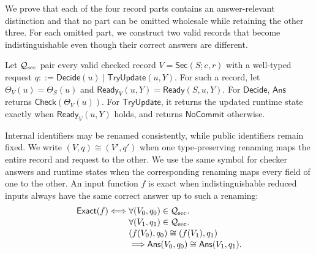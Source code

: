 We prove that each of the four record parts contains an answer-relevant distinction and that no part can be omitted wholesale while retaining the other three.
For each omitted part, we construct two valid records that become indistinguishable even though their correct answers are different.

Let \(\mathcal Q_{\rm sec}\) pair every valid checked record \(V=\mathsf{Sec}(S;c,r)\) with a well-typed request \(q::=\mathsf{Decide}(u)\mid\mathsf{TryUpdate}(u,Y)\).
For such a record, let \(\Theta_V(u)=\Theta_S(u)\) and \(\mathsf{Ready}_V(u,Y)=\mathsf{Ready}(S,u,Y)\).
For \(\mathsf{Decide}\), \(\mathsf{Ans}\) returns \(\mathsf{Check}(\Theta_V(u))\).
For \(\mathsf{TryUpdate}\), it returns the updated runtime state exactly when \(\mathsf{Ready}_V(u,Y)\) holds, and returns \(\mathsf{NoCommit}\) otherwise.

Internal identifiers may be renamed consistently, while public identifiers remain fixed.
We write \((V,q)\cong(V',q')\) when one type-preserving renaming maps the entire record and request to the other.
We use the same symbol for checker answers and runtime states when the corresponding renaming maps every field of one to the other.
An input function \(f\) is exact when indistinguishable reduced inputs always have the same correct answer up to such a renaming:
\[
\begin{aligned}
\mathsf{Exact}(f)\Longleftrightarrow {}&
\forall (V_0,q_0)\in\mathcal Q_{\rm sec}.\\[-2pt]
&\forall (V_1,q_1)\in\mathcal Q_{\rm sec}.\\[-2pt]
&(f(V_0),q_0)\cong(f(V_1),q_1)\\[-2pt]
&\Longrightarrow
\mathsf{Ans}(V_0,q_0)\cong\mathsf{Ans}(V_1,q_1).
\end{aligned}
\]

